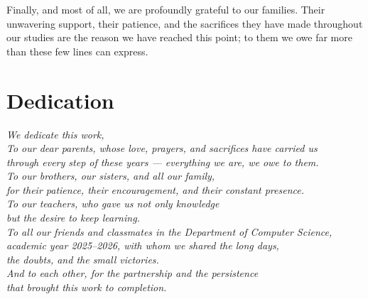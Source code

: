 \documentclass[12pt, a4paper]{report}
\begin{document}
Finally, and most of all, we are profoundly grateful to our families. Their unwavering support, their patience, and the sacrifices they have made throughout our studies are the reason we have reached this point; to them we owe far more than these few lines can express.

\newpage

\chapter*{Dedication}

\vspace*{2cm}
\begin{flushright}
\textit{We dedicate this work,}\\[1cm]
\textit{To our dear parents, whose love, prayers, and sacrifices have carried us\\
through every step of these years --- everything we are, we owe to them.}\\[1cm]
\textit{To our brothers, our sisters, and all our family,\\
for their patience, their encouragement, and their constant presence.}\\[1cm]
\textit{To our teachers, who gave us not only knowledge\\
but the desire to keep learning.}\\[1cm]
\textit{To all our friends and classmates in the Department of Computer Science,\\
academic year 2025--2026, with whom we shared the long days,\\
the doubts, and the small victories.}\\[1cm]
\textit{And to each other, for the partnership and the persistence\\
that brought this work to completion.}
\end{flushright}

\newpage

{}
\end{document}
